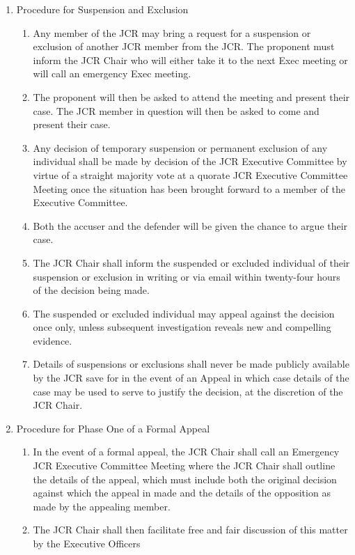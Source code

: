 \begin{enumerate}
\begin{enumerate}
\begin{enumerate}
        \end{enumerate}
    \end{enumerate}
    \item Procedure for Suspension and Exclusion
    \begin{enumerate}
        \item Any member of the JCR may bring a request for a suspension or exclusion of another JCR member from the JCR. The proponent must inform the JCR Chair who will either take it to the next Exec meeting or will call an emergency Exec meeting.
        \item The proponent will then be asked to attend the meeting and present their case. The JCR member in question will then be asked to come and present their case.
        \item Any decision of temporary suspension or permanent exclusion of any individual shall be made by decision of the JCR Executive Committee by virtue of a straight majority vote at a quorate JCR Executive Committee Meeting once the situation has been brought forward to a member of the Executive Committee.
        \item Both the accuser and the defender will be given the chance to argue their case.
        \item The JCR Chair shall inform the suspended or excluded individual of their suspension or exclusion in
        writing or via email within twenty-four hours of the decision being made.
        \item The suspended or excluded individual may appeal against the decision once only, unless subsequent investigation reveals new and compelling evidence.
        \item Details of suspensions or exclusions shall never be made publicly available by the JCR save for in the event of an Appeal in which case details of the case may be used to serve to justify the decision, at the discretion of the JCR Chair.
    \end{enumerate}
    \item Procedure for Phase One of a Formal Appeal
    \label{it:Appeal}
    \begin{enumerate}
        \item In the event of a formal appeal, the JCR Chair shall call an Emergency JCR Executive Committee Meeting where the JCR Chair shall outline the details of the appeal, which must include both the original decision against which the appeal in made and the details of the opposition as made by the appealing member.
        \item The JCR Chair shall then facilitate free and fair discussion of this matter by the Executive Officers

\end{enumerate}
\end{enumerate}
